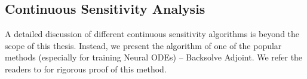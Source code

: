 \begin{table}[t]
  \centering
  \caption{\textbf{Memory Requirements for various Sensitivity Algorithms for ODEs}: $s$ is the number of states, $t$ is the number of time steps for the ODE Solve, $c$ is the number of checkpoints ($c << t$) and stages is the number of stages of the ODE solver.}
  \label{tab:memory_requirements_sensitivity_analysis_odes}
\end{table}



\subsection{Continuous Sensitivity Analysis}
\label{subsec:continuous_sensitivity_analysis_odes}

A detailed discussion of different continuous sensitivity algorithms is beyond the scope of this thesis. Instead, we present the algorithm of one of the popular methods (especially for training Neural ODEs) -- Backsolve Adjoint. We refer the readers to \citet[Appendix B]{chen2018neural} for rigorous proof of this method.

